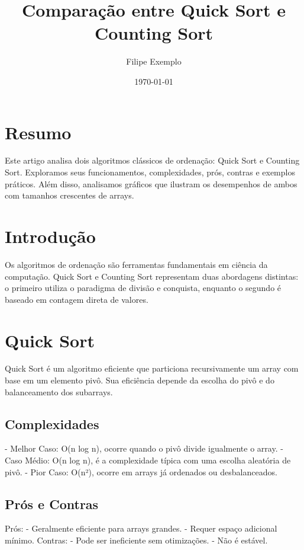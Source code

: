 \documentclass{article}%
\title{Comparação entre Quick Sort e Counting Sort}%
\author{Filipe Exemplo}%
\date{\today}%
\begin{document}
%
\normalsize%
\maketitle%
\section*{Resumo}%
\label{sec:Resumo}%
Este artigo analisa dois algoritmos clássicos de ordenação: Quick Sort e Counting Sort. Exploramos seus funcionamentos, complexidades, prós, contras e exemplos práticos. Além disso, analisamos gráficos que ilustram os desempenhos de ambos com tamanhos crescentes de arrays.

%
\section{Introdução}%
\label{sec:Introduo}%
Os algoritmos de ordenação são ferramentas fundamentais em ciência da computação. Quick Sort e Counting Sort representam duas abordagens distintas: o primeiro utiliza o paradigma de divisão e conquista, enquanto o segundo é baseado em contagem direta de valores.

%
\section{Quick Sort}%
\label{sec:QuickSort}%
Quick Sort é um algoritmo eficiente que particiona recursivamente um array com base em um elemento pivô. Sua eficiência depende da escolha do pivô e do balanceamento dos subarrays.%
\subsection{Complexidades}%
\label{subsec:Complexidades}%
{-} Melhor Caso: O(n log n), ocorre quando o pivô divide igualmente o array.\newline%
{-} Caso Médio: O(n log n), é a complexidade típica com uma escolha aleatória de pivô.\newline%
{-} Pior Caso: O(n²), ocorre em arrays já ordenados ou desbalanceados.\newline%

%
\subsection{Prós e Contras}%
\label{subsec:PrseContras}%
Prós:\newline%
{-} Geralmente eficiente para arrays grandes.\newline%
{-} Requer espaço adicional mínimo.\newline%
\newline%
Contras:\newline%
{-} Pode ser ineficiente sem otimizações.\newline%
{-} Não é estável.
\end{document}
